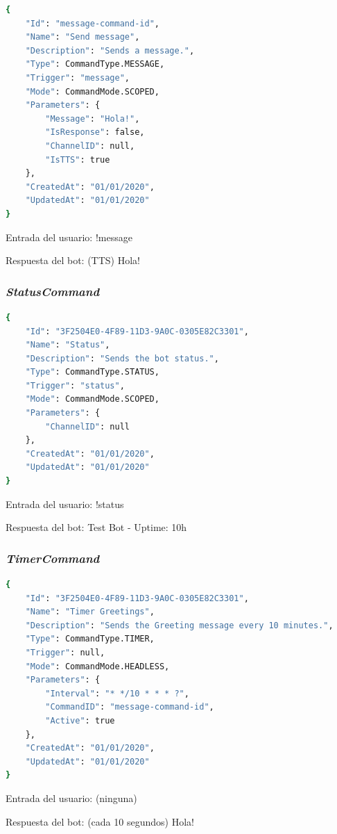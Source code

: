 \begin{lstlisting}[language=sh]
{
    "Id": "message-command-id",
    "Name": "Send message",
    "Description": "Sends a message.",
    "Type": CommandType.MESSAGE,
    "Trigger": "message",
    "Mode": CommandMode.SCOPED,
    "Parameters": {
        "Message": "Hola!",
        "IsResponse": false,
        "ChannelID": null,
        "IsTTS": true
    },
    "CreatedAt": "01/01/2020",
    "UpdatedAt": "01/01/2020"
}
\end{lstlisting}

Entrada del usuario: !message

Respuesta del bot: (TTS) Hola!



\subsubsection{\textit{StatusCommand}}

\begin{lstlisting}[language=sh]
{
    "Id": "3F2504E0-4F89-11D3-9A0C-0305E82C3301",
    "Name": "Status",
    "Description": "Sends the bot status.",
    "Type": CommandType.STATUS,
    "Trigger": "status",
    "Mode": CommandMode.SCOPED,
    "Parameters": {
        "ChannelID": null
    },
    "CreatedAt": "01/01/2020",
    "UpdatedAt": "01/01/2020"
}
\end{lstlisting}

Entrada del usuario: !status

Respuesta del bot: Test Bot - Uptime: 10h

\subsubsection{\textit{TimerCommand}}

\begin{lstlisting}[language=sh]
{
    "Id": "3F2504E0-4F89-11D3-9A0C-0305E82C3301",
    "Name": "Timer Greetings",
    "Description": "Sends the Greeting message every 10 minutes.",
    "Type": CommandType.TIMER,
    "Trigger": null,
    "Mode": CommandMode.HEADLESS,
    "Parameters": {
        "Interval": "* */10 * * * ?",
        "CommandID": "message-command-id",
        "Active": true
    },
    "CreatedAt": "01/01/2020",
    "UpdatedAt": "01/01/2020"
}
\end{lstlisting}

Entrada del usuario: (ninguna)

Respuesta del bot: (cada 10 segundos) Hola!



